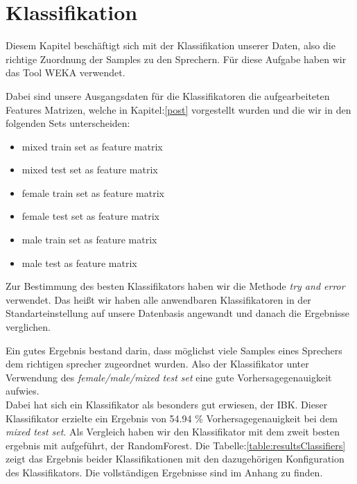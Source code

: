 \section{Klassifikation}
\label{classification}

Diesem Kapitel beschäftigt sich mit der Klassifikation unserer Daten, also die richtige Zuordnung der Samples zu den Sprechern. Für diese Aufgabe haben wir das Tool WEKA verwendet.

Dabei sind unsere Ausgangsdaten für die Klassifikatoren die aufgearbeiteten Features Matrizen, welche in Kapitel:\ref{post} vorgestellt wurden und die wir in den folgenden Sets unterscheiden:
\begin{itemize}
    \item[\textbullet] mixed train set as feature matrix
    \item[\textbullet] mixed test set as feature matrix
    \item[\textbullet] female train set as feature matrix
    \item[\textbullet] female test set as feature matrix
    \item[\textbullet] male train set as feature matrix
    \item[\textbullet] male test as feature matrix
\end{itemize}

Zur Bestimmung des besten Klassifikators haben wir die Methode \textit{try and error} verwendet. Das heißt wir haben alle anwendbaren Klassifikatoren in der Standarteinstellung auf unsere Datenbasis angewandt und danach die Ergebnisse verglichen.

Ein gutes Ergebnis bestand darin, dass möglichst viele Samples eines Sprechers dem richtigen sprecher zugeordnet wurden. Also der Klassifikator unter Verwendung des \textit{female/male/mixed test set} eine gute Vorhersagegenauigkeit aufwies.\\


Dabei hat sich ein Klassifikator als besonders gut erwiesen, der IBK. Dieser Klassifikator erzielte ein Ergebnis von 54.94 \% Vorhersagegenauigkeit bei dem 
\textit{mixed test set}. Als Vergleich haben wir den Klassifikator mit dem zweit besten ergebnis mit aufgeführt, der RandomForest. Die Tabelle:\ref{table:resultsClassifiers} zeigt das Ergebnis beider Klassifikationen mit den dazugehörigen Konfiguration des Klassifikators. Die vollständigen Ergebnisse sind im Anhang zu finden.\\


